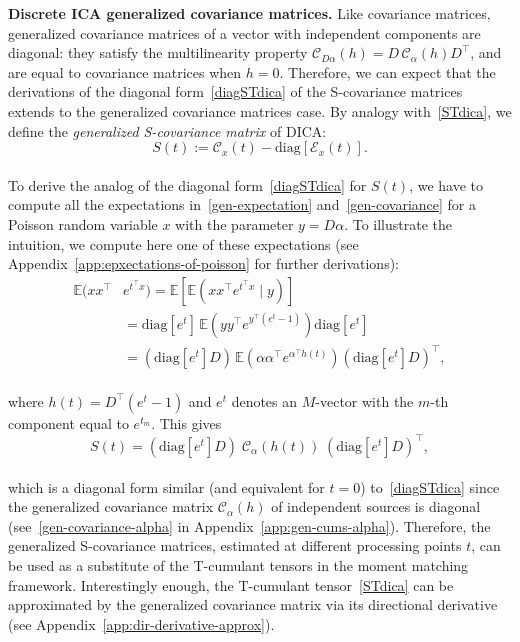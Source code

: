 \documentclass{article}
\newcommand{\ppp}{\textbf}
\newcommand{\one}{1}
\newcommand{\zero}{0}
\newcommand{\Rra}[1]{\left(#1\right)}
\newcommand{\rbra}[1]{\left(#1\right)}
\newcommand{\diag}{\mathrm{diag}}
\newcommand{\ebb}{\mathbb{E}}
\newcommand{\ccal}{\mathcal{C}}
\newcommand{\ecal}{\mathcal{E}}
\begin{document}
\ppp{Discrete ICA generalized covariance matrices.} 
Like covariance matrices, generalized covariance matrices of a vector with independent components are diagonal: they satisfy the multilinearity property $\ccal_{D\alpha}(h) = D\,\ccal_{\alpha}(h)D^{\top}$, and are equal to covariance matrices when $h=\zero$.
Therefore, we can expect that the derivations of the diagonal form~\eqref{diagSTdica} of the S-covariance matrices extends to the generalized covariance matrices case.
By analogy with~\eqref{STdica}, we define the \emph{generalized S-covariance matrix} of DICA:
\\[-0.8em]
\begin{equation}\label{GenSdica}
S(t) := \ccal_x(t) - \diag[\ecal_x(t)].
\end{equation}
\\[-1.2em]
To derive the analog of the diagonal form~\eqref{diagSTdica} for $S(t)$, we have to compute all the expectations in~\eqref{gen-expectation} and~\eqref{gen-covariance} for a Poisson random variable $x$ with the parameter $y=D\alpha$. 
To illustrate the intuition, we compute here one of these expectations (see Appendix~\ref{app:epxectations-of-poisson} for further derivations):
\\[-0.6em]
\[
\begin{aligned}
\ebb( xx^{\top} & e^{t^{\top}x} )  = \ebb[ \ebb( xx^{\top} e^{t^{\top} x} \; | \; y ) ]\\
& = \diag[e^t]\, \ebb (yy^{\top} e^{y^{\top}(e^t-\one)} ) \diag[e^t] \\
& = \rbra{\diag[e^t] D}\, \ebb ({\alpha\alpha^{\top} e^{\alpha^{\top} h(t)} }) \rbra{\diag[e^t]D}^{\top}, 
\end{aligned}
\]
\\[-0.4em]
where $h(t) = D^{\top} (e^t-1)$ and $e^t$ denotes an $M$-vector with the $m$-th component equal to $e^{t_m}$.
This gives
\\[-1.5em]
\begin{equation}\label{diagGenSdica}
S(t) = \Rra{\diag[e^t]{D}} \; \ccal_{\alpha}\Rra{h(t)} \; \Rra{\diag[e^t]{D}}^{\top},
\end{equation}
\\[-1.5em]
which is a diagonal form similar (and equivalent for $t=\zero$) to~\eqref{diagSTdica} since the generalized covariance matrix $\ccal_{\alpha}(h)$ of independent sources is diagonal (see~\eqref{gen-covariance-alpha} in Appendix~\ref{app:gen-cums-alpha}). Therefore, the generalized S-covariance matrices, estimated at different processing points $t$, can be used as a substitute of the T-cumulant tensors in the moment matching framework. Interestingly enough, the T-cumulant tensor~\eqref{STdica} can be approximated by the generalized covariance matrix via its directional derivative (see Appendix~\ref{app:dir-derivative-approx}).
\end{document}
